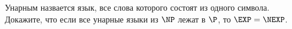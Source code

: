 Унарным назвается язык, все слова которого состоят из одного символа. Докажите, что если все унарные языки из $\NP$ лежат в
$\P$, то $\EXP = \NEXP$.